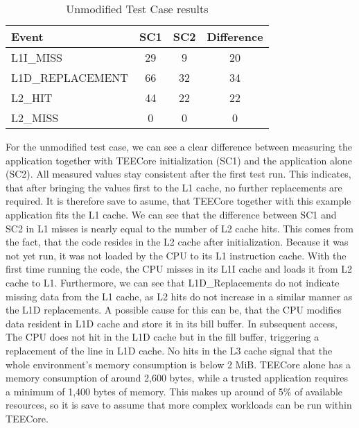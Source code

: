 \begin{table}[ht]
  \centering
  \begin{tabular}{ |l||c|c|c| }
    \hline
    Event            & SC1 & SC2 & Difference \\
    \hline
    L1I\_MISS        & 29  & 9   & 20         \\
    L1D\_REPLACEMENT & 66  & 32  & 34         \\
    L2\_HIT          & 44  & 22  & 22         \\
    L2\_MISS         & 0   & 0   & 0          \\
    \hline
  \end{tabular}
  \caption{Unmodified Test Case results}
  \label{50:tab:ping_base}
\end{table}

For the unmodified test case, we can see a clear difference between measuring
the application together with TEECore initialization (SC1) and the application
alone (SC2). All measured values stay consistent after the first test run. This
indicates, that after bringing the values first to the L1 cache, no further
replacements are required. It is therefore save to asume, that TEECore together
with this example application fits the L1 cache. We can see that the difference
between SC1 and SC2 in L1 misses is nearly equal to the number of L2 cache hits.
This comes from the fact, that the code resides in the L2 cache after
initialization. Because it was not yet run, it was not loaded by the CPU to its
L1 instruction cache. With the first time running the code, the CPU misses in
its L1I cache and loads it from L2 cache to L1. Furthermore, we can see that
L1D\_Replacements do not indicate missing data from the L1 cache, as L2 hits do
not increase in a similar manner as the L1D replacements. A possible cause for
this can be, that the CPU modifies data resident in L1D cache and store it in
its bill buffer. In subsequent access, The CPU does not hit in the L1D cache but
in the fill buffer, triggering a replacement of the line in L1D cache. No hits
in the L3 cache signal that the whole environment's memory consumption is below
2 MiB. TEECore alone has a memory consumption of around 2,600 bytes, while a
trusted application requires a minimum of 1,400 bytes of memory. This makes up
around of 5\% of available resources, so it is save to assume that more complex
workloads can be run within TEECore.\\

